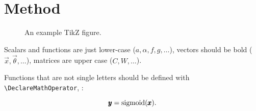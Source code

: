 \section{Method}
\label{sec:method}

\begin{figure}
  \centerline{}
  \caption{An example TikZ figure.}
  \label{fig:method:overview}
\end{figure}

Scalars and functions are just lower-case ($a, \alpha, f, g, \ldots$), vectors
should be bold ($\vec{x}, \vec{\theta}, \ldots$), matrices are upper case ($C,
W, \ldots$).

Functions that are not single letters should be defined with
\verb#\DeclareMathOperator#, \eg:

\begin{equation}
  \pmb{y}=\operatorname{sigmoid}(\pmb{x})
  \text{.}
\end{equation}
